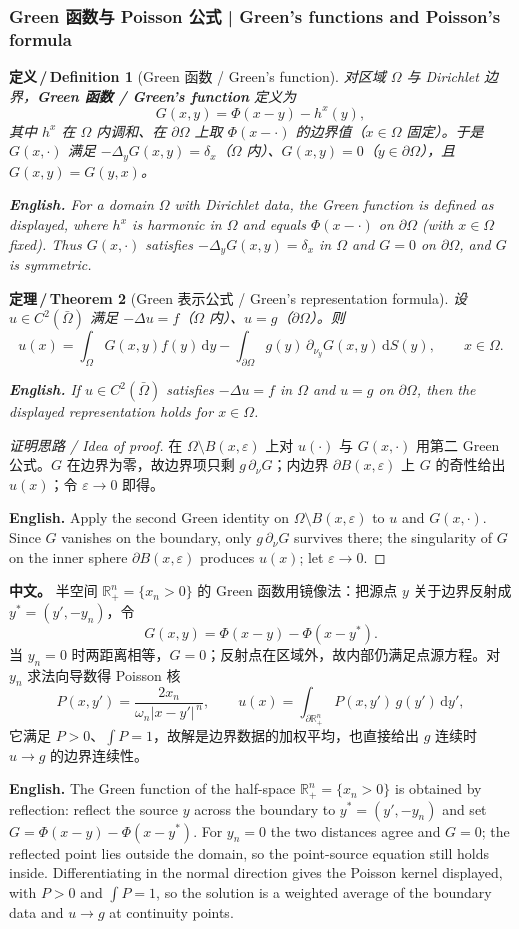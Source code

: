 \documentclass[UTF8,11pt,a4paper]{ctexart}
\newcommand{\APS}[2]{\par\noindent\textbf{中文。} #1\par\noindent\textbf{English.} #2\par\smallskip}
\newcommand{\EN}[1]{\par\noindent \textbf{English.} #1\par}
\newtheorem{definition}{定义\,/\,Definition}[section]
\newtheorem{theorem}[definition]{定理\,/\,Theorem}
\newcommand{\R}{\mathbb{R}}
\newcommand{\dd}{\mathrm{d}}
\begin{document}
\subsubsection{Green 函数与 Poisson 公式 | Green's functions and Poisson's formula}
\begin{definition}[Green 函数 / Green's function]\label{def:green}
对区域 $\Omega$ 与 Dirichlet 边界，\textbf{Green 函数 / Green's function} 定义为
\[
G(x,y)=\Phi(x-y)-h^x(y),
\]
其中 $h^x$ 在 $\Omega$ 内调和、在 $\partial\Omega$ 上取 $\Phi(x-\cdot)$ 的边界值（$x\in\Omega$ 固定）。于是 $G(x,\cdot)$ 满足 $-\Delta_yG(x,y)=\delta_x$（$\Omega$ 内）、$G(x,y)=0$（$y\in\partial\Omega$），且 $G(x,y)=G(y,x)$。
\EN{For a domain $\Omega$ with Dirichlet data, the Green function is defined as displayed, where $h^x$ is harmonic in $\Omega$ and equals $\Phi(x-\cdot)$ on $\partial\Omega$ (with $x\in\Omega$ fixed). Thus $G(x,\cdot)$ satisfies $-\Delta_yG(x,y)=\delta_x$ in $\Omega$ and $G=0$ on $\partial\Omega$, and $G$ is symmetric.}
\end{definition}

\begin{theorem}[Green 表示公式 / Green's representation formula]\label{thm:greenrep}
设 $u\in C^2(\bar\Omega)$ 满足 $-\Delta u=f$（$\Omega$ 内）、$u=g$（$\partial\Omega$）。则
\[
u(x)=\int_\Omega G(x,y)f(y)\,\dd y-\int_{\partial\Omega}g(y)\,\partial_{\nu_y}G(x,y)\,\dd S(y),\qquad x\in\Omega .
\]
\EN{If $u\in C^2(\bar\Omega)$ satisfies $-\Delta u=f$ in $\Omega$ and $u=g$ on $\partial\Omega$, then the displayed representation holds for $x\in\Omega$.}
\end{theorem}

\begin{proof}[证明思路 / Idea of proof]
在 $\Omega\setminus B(x,\varepsilon)$ 上对 $u(\cdot)$ 与 $G(x,\cdot)$ 用第二 Green 公式。$G$ 在边界为零，故边界项只剩 $g\,\partial_\nu G$；内边界 $\partial B(x,\varepsilon)$ 上 $G$ 的奇性给出 $u(x)$；令 $\varepsilon\to0$ 即得。\EN{Apply the second Green identity on $\Omega\setminus B(x,\varepsilon)$ to $u$ and $G(x,\cdot)$. Since $G$ vanishes on the boundary, only $g\,\partial_\nu G$ survives there; the singularity of $G$ on the inner sphere $\partial B(x,\varepsilon)$ produces $u(x)$; let $\varepsilon\to0$.}
\end{proof}

\APS{半空间 $\R^n_+=\{x_n>0\}$ 的 Green 函数用镜像法：把源点 $y$ 关于边界反射成 $y^*=(y',-y_n)$，令
\[
G(x,y)=\Phi(x-y)-\Phi(x-y^*).
\]
当 $y_n=0$ 时两距离相等，$G=0$；反射点在区域外，故内部仍满足点源方程。对 $y_n$ 求法向导数得 Poisson 核
\[
P(x,y')=\frac{2x_n}{\omega_n|x-y'|^{\,n}},\qquad
u(x)=\int_{\partial\R^n_+}P(x,y')\,g(y')\,\dd y' ,
\]
它满足 $P>0$、$\int P=1$，故解是边界数据的加权平均，也直接给出 $g$ 连续时 $u\to g$ 的边界连续性。}{The Green function of the half-space $\R^n_+=\{x_n>0\}$ is obtained by reflection: reflect the source $y$ across the boundary to $y^*=(y',-y_n)$ and set $G=\Phi(x-y)-\Phi(x-y^*)$. For $y_n=0$ the two distances agree and $G=0$; the reflected point lies outside the domain, so the point-source equation still holds inside. Differentiating in the normal direction gives the Poisson kernel displayed, with $P>0$ and $\int P=1$, so the solution is a weighted average of the boundary data and $u\to g$ at continuity points.}
\end{document}
